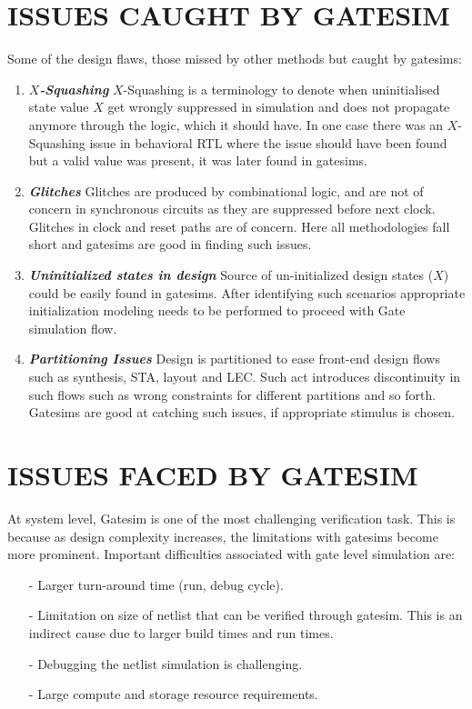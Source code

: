 \section{ISSUES CAUGHT BY GATESIM}
Some of the design flaws, those missed by other methods but caught by gatesims:
\begin{enumerate}

\item \emph{\bf $X$-Squashing}
	$X$-Squashing is a terminology to denote when uninitialised state value $X$ get wrongly suppressed in simulation and does not propagate anymore through the logic, which it should have. In one case there was an $X$-Squashing issue in behavioral RTL where the issue should have been found but a valid value was present, it was later found in gatesims.

\item \emph{\bf Glitches}
	Glitches are produced by combinational logic, and are not of concern in synchronous circuits as they are suppressed before next clock. Glitches in clock and reset paths are of concern. Here all methodologies fall short and gatesims are good in finding such issues.

\item \emph{\bf Uninitialized states in design}
	Source of un-initialized design states ($X$) could be easily found in gatesims. After identifying such scenarios appropriate initialization modeling needs to be performed to proceed with Gate simulation flow.

\item \emph{\bf Partitioning Issues}
	Design is partitioned to ease front-end design flows such as synthesis, STA, layout and LEC. Such act introduces discontinuity in such flows such as wrong constraints for different partitions and so forth. Gatesims are good at catching such issues, if appropriate stimulus is chosen.

\end{enumerate}







\section{ISSUES FACED BY GATESIM}
\label{intro:sec:ifg}
At system level, Gatesim is one of the most challenging verification task. This is because as design complexity increases, the limitations with gatesims become more prominent. Important difficulties associated with gate level simulation are:
\begin{itemize}


\item[-] Larger turn-around time (run, debug cycle).
\item[-] Limitation on size of netlist that can be verified through gatesim. This is an indirect cause due to larger build times and run times.
\item[-] Debugging the netlist simulation is challenging.
\item[-] Large compute and storage resource requirements. 

\end{itemize}

